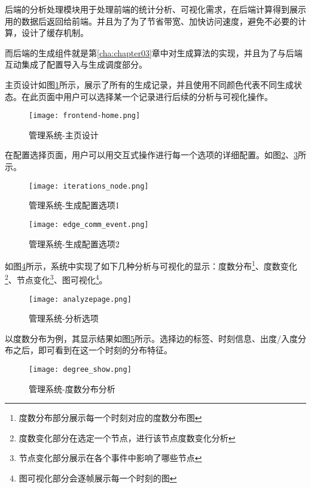 后端的分析处理模块用于处理前端的统计分析、可视化需求，在后端计算得到展示用的数据后返回给前端。并且为了为了节省带宽、加快访问速度，避免不必要的计算，设计了缓存机制。

而后端的生成组件就是第\ref{cha:chapter03}章中对生成算法的实现，并且为了与后端互动集成了配置导入与生成调度部分。

主页设计如图\ref{fig:frontend-home}所示，展示了所有的生成记录，并且使用不同颜色代表不同生成状态。在此页面中用户可以选择某一个记录进行后续的分析与可视化操作。

\begin{figure}[H]
  \centering
  \texttt{[image: frontend-home.png]}
  \caption{管理系统-主页设计}
  \label{fig:frontend-home}
\end{figure}

在配置选择页面，用户可以用交互式操作进行每一个选项的详细配置。如图\ref{fig:iterations_node}、\ref{fig:edge_comm_event}所示。

\begin{figure}[H]
  \centering
  \texttt{[image: iterations\_node.png]}
  \caption{管理系统-生成配置选项1}
  \label{fig:iterations_node}
\end{figure}

\begin{figure}[H]
  \centering
  \texttt{[image: edge\_comm\_event.png]}
  \caption{管理系统-生成配置选项2}
  \label{fig:edge_comm_event}
\end{figure}

如图\ref{fig:analyzepage}所示，系统中实现了如下几种分析与可视化的显示：度数分布\footnote{度数分布部分展示每一个时刻对应的度数分布图}、度数变化\footnote{度数变化部分在选定一个节点，进行该节点度数变化分析}、节点变化\footnote{节点变化部分展示在各个事件中影响了哪些节点}、图可视化\footnote{图可视化部分会逐帧展示每一个时刻的图}。

\begin{figure}[H]
  \centering
  \texttt{[image: analyzepage.png]}
  \caption{管理系统-分析选项}
  \label{fig:analyzepage}
\end{figure}

以度数分布为例，其显示结果如图\ref{fig:degree_show}所示。选择边的标签、时刻信息、出度/入度分布之后，即可看到在这一个时刻的分布特征。

\begin{figure}[H]
  \centering
  \texttt{[image: degree\_show.png]}
  \caption{管理系统-度数分布分析}
  \label{fig:degree_show}
\end{figure}

